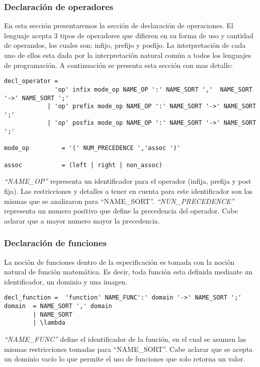 \subsubsection{Declaración de operadores}
En esta sección presentaremos la sección de declaración de operaciones. El lenguaje acepta 3 tipos de operadores que difieren en su forma de uso y cantidad de operandos, los cuales son: infijo, prefijo y posfijo. La interpretación de cada uno de ellos esta dada por la interpretación natural común a todos los lenguajes de programación. A continuación se presenta esta sección con mas detalle:
\begin{center}
\lstset{language=inform}
\tiny
\begin{lstlisting}[frame=single]
decl_operator = 
              'op' infix mode_op NAME_OP ':' NAME_SORT ','  NAME_SORT '->' NAME_SORT ';' 
            | 'op' prefix mode_op NAME_OP ':' NAME_SORT '->' NAME_SORT ';'               
            | 'op' posfix mode_op NAME_OP ':' NAME_SORT '->' NAME_SORT ';'

mode_op         = '(' NUM_PRECEDENCE ','assoc ')'

assoc           = (left | right | non_assoc) 
\end{lstlisting}
\end{center}
\textit{``NAME\_OP''} representa un identificador para el operador (infija, prefija y post fija). Las restricciones y detalles a tener en cuenta para este identificador son las mismas que se analizaron para ``NAME\_SORT''.
\textit{``NUN\_PRECEDENCE''} representa un numero positivo que define la precedencia del operador. Cabe aclarar que a mayor numero mayor la precedencia.
\subsubsection{Declaración de funciones}
 La noción de funciones dentro de la especificación es tomada con la noción natural de función matemática. Es decir, toda función esta definida mediante un identificador, un dominio y una imagen.
\begin{center}
\lstset{language=inform}
\tiny
\begin{lstlisting}[frame=single]
decl_function =  'function' NAME_FUNC':' domain '->' NAME_SORT ';'
domain  = NAME_SORT ',' domain
        | NAME_SORT 
        | \lambda
\end{lstlisting}
\end{center}
\textit{``NAME\_FUNC''} define el identificador de la función, en el cual se asumen las mismas restricciones tomadas para ``NAME\_SORT''. Cabe aclarar que se acepta un dominio vacío lo que permite el uso de funciones que solo retorna un valor.
